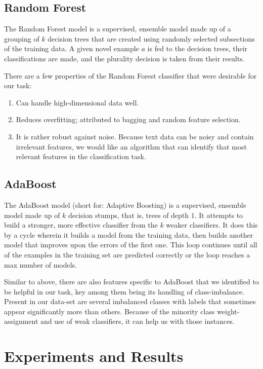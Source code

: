 \documentclass{article}
\begin{document}
\subsection{Random Forest}

The Random Forest model is a supervised, ensemble model made up of a grouping of $k$ decision trees that 
are created using randomly selected subsections of the training data. A given 
novel example $a$ is fed to the decision trees, their classifications are made, and
the plurality decision is taken from their results.


There are a few properties of the Random Forest classifier that were desirable for
  our task: 
  \begin{enumerate}
    \item Can handle high-dimensional data well. 
    \item Reduces overfitting; attributed to bagging and random feature selection. 
    \item It is rather robust against noise. Because text data can be noisy and 
      contain irrelevant features, we would like an algorithm that can identify 
      that most relevant features in the classification task.
  \end{enumerate}

\subsection{AdaBoost}

The AdaBoost model (short for: Adaptive Boosting) is a supervised, ensemble model made up of $k$ decision stumps, that
is, trees of depth $1$. It attempts to build a stronger, more effective 
classifier from the $k$ weaker classifiers. It does this by a cycle wherein it 
builds a model from the training data, then builds another model that improves 
upon the errors of the first one. This loop continues until all of the examples 
in the training set are predicted correctly or the loop reaches a max number 
of models. 

Similar to above, there are also features specific to AdaBoost that we identified to be
  helpful in our task, key among them being its handling of class-imbalance. 
  Present in our data-set are several imbalanced 
  classes with labels that sometimes appear significantly more than others. Because
  of the minority class weight-assignment and use of weak classifiers, it can help 
  us with those instances.

\section{Experiments and Results}
\end{document}
